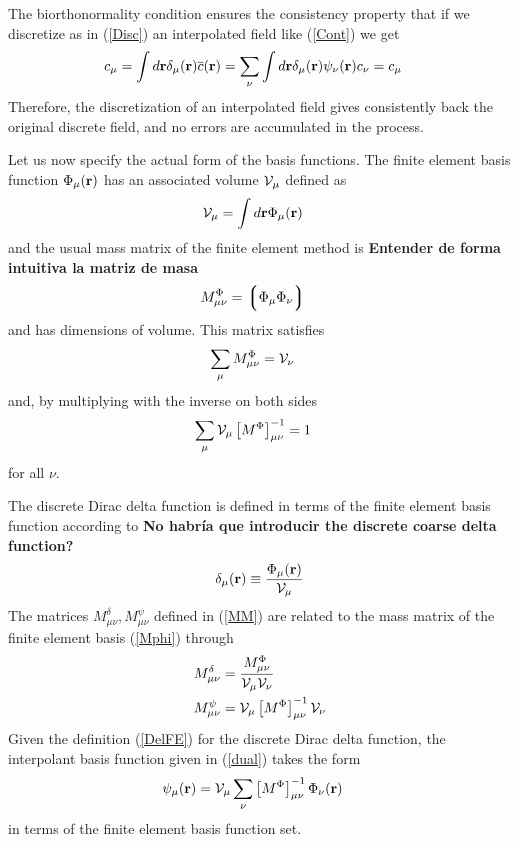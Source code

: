 \documentclass[b5paper,openright,11pt]{book}
\newcommand{\Note}[1]{{\bf \color{red}#1}}    %
\newcommand{\llg}{\left\lgroup}
\newcommand{\rlg}{\right\rgroup}
\begin{document}
The biorthonormality  condition ensures the consistency  property that
if  we  discretize  as  in (\ref{Disc})  an  interpolated  field  like
(\ref{Cont}) we get
\begin{align}
  c_\mu&=\int d{\bf r}\delta_\mu({\bf r})\overline{c}({\bf r})
=\sum_\nu\int d{\bf r}\delta_\mu({\bf r})\psi_\nu({\bf r})c_\nu=c_\mu
\end{align}
Therefore,  the   discretization  of   an  interpolated   field  gives
consistently back the original discrete field, and no errors are accumulated in the process.

Let us now specify the actual form of the basis functions.  The finite
element basis  function $\Phi_\mu({\bf  r})$ has an  associated volume
${\cal V}_\mu$ defined as
\begin{align}
  {\cal V}_{\mu}&=\int d{\bf r}\Phi_\mu({\bf r})
\end{align}
and the usual mass matrix of the finite element method is \Note{Entender de forma intuitiva la matriz de masa}
\begin{align}
M^\Phi_{\mu\nu}&=\llg\Phi_\mu\Phi_\nu\rlg  
\label{Mphi}
\end{align}
 and has dimensions of volume. This matrix satisfies 
\begin{align}
\sum_\mu M^\Phi_{\mu\nu} &={\cal V}_\nu
\end{align}
and, by multiplying with the inverse on both sides
\begin{align}
  \sum_\mu {\cal V}_\mu \left[M^{\Phi}\right]^{-1}_{\mu\nu}&=1
\label{sumM}
\end{align}
for all $\nu$.

The discrete  Dirac delta function is  defined in terms of  the finite
element basis function according to \Note{No habría que introducir the discrete coarse delta function?}
\begin{align}
  \delta_\mu({\bf r})\equiv\frac{\Phi_\mu({\bf r})}{{\cal V}_\mu}
\label{DelFE}
\end{align}
The matrices $M^\delta_{\mu\nu}, M^\psi_{\mu\nu}$ defined in (\ref{MM}) are related to
the mass matrix of the finite element basis (\ref{Mphi}) through
\begin{align}
  M^\delta_{\mu\nu}&=\frac{  M^\Phi_{\mu\nu}}{{\cal V}_\mu{\cal V}_\nu}
\nonumber\\
M^\psi_{\mu\nu}&={\cal V}_\mu \left[M^{\Phi}\right]^{-1}_{\mu\nu}{\cal V}_\nu
\label{MdMp}
\end{align}
Given the definition (\ref{DelFE}) for the discrete Dirac delta function,  the interpolant basis function given in (\ref{dual}) takes the form
\begin{align}
  \psi_\mu({\bf r})&
  ={\cal V}_\mu \sum_\nu \left[M^{\Phi}\right]^{-1}_{\mu\nu} \Phi_\nu({\bf r})
\label{PsiFE}
\end{align}
in terms of the finite element basis function set.
\end{document}
